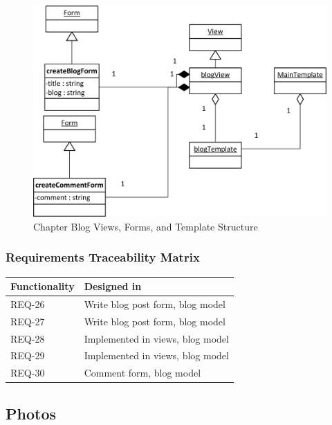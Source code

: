 \documentclass{article}
\begin{document}
\FloatBarrier
\begin{figure}[h!]
\centering
\includegraphics[scale=.65]{img/viewFormTemplateDiagrams/blog}
\caption{Chapter Blog Views, Forms, and Template Structure}
\label{fig:chapterBlogViewFormTemplateDiagram}
\end{figure}
\FloatBarrier

\subsubsection{Requirements Traceability Matrix}

\begin{table}
    \begin{tabular}{|l|l|}
        \hline
        Functionality & Designed in                      \\ \hline
        REQ-26        & Write blog post form, blog model \\ 
        REQ-27        & Write blog post form, blog model \\ 
        REQ-28        & Implemented in views, blog model \\ 
        REQ-29        & Implemented in views, blog model \\ 
        REQ-30        & Comment form, blog model         \\
        \hline
    \end{tabular}
\end{table}


\subsection{Photos}
\end{document}
